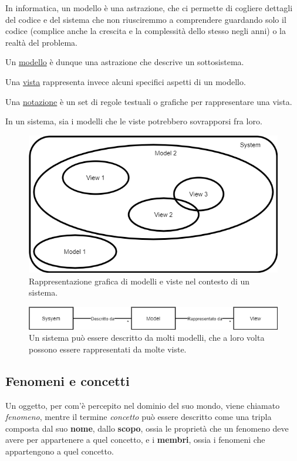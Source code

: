     In informatica, un modello è una astrazione, che ci permette di cogliere dettagli del codice e del sistema che non riusciremmo a comprendere guardando solo il codice (complice anche la crescita e la complessità dello stesso negli anni) o la realtà del problema.
    
    Un \underline{modello} è dunque una astrazione che descrive un sottosistema.
    
    Una \underline{vista} rappresenta invece alcuni specifici aspetti di un modello. 
    
    Una \underline{notazione} è un set di regole testuali o grafiche per rappresentare una vista.
    
    In un sistema, sia i modelli che le viste potrebbero sovrapporsi fra loro.
    
    \begin{figure}[h!]
        \centering
        \includegraphics[scale=0.66]{Images/model_view.png}
        \caption{Rappresentazione grafica di modelli e viste nel contesto di un sistema.}
        \label{fig:model_view}
    \end{figure}
    
    \begin{figure}[h!]
        \centering
        \includegraphics[width=\textwidth]{Images/model_view_UML.png}
        \caption{Un sistema può essere descritto da molti modelli, che a loro volta possono essere rappresentati da molte viste.}
        \label{fig:model_view_UML}
    \end{figure}
    
\subsection{Fenomeni e concetti}
    Un oggetto, per com'è percepito nel dominio del suo mondo, viene chiamato \textit{fenomeno}, mentre il termine \textit{concetto} può essere descritto come una tripla composta dal suo \textbf{nome}, dallo \textbf{scopo}, ossia le proprietà che un fenomeno deve avere per appartenere a quel concetto, e i \textbf{membri}, ossia i fenomeni che appartengono a quel concetto.
    
